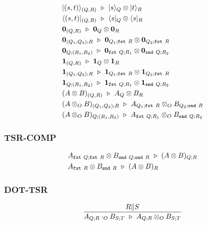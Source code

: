 \begin{align*}
  & |(s, t)\rangle_{(Q, R)} \ \triangleright\  |s\rangle_{Q} \otimes |t\rangle_{R} \\
  & \langle (s, t)|_{(Q, R)} \ \triangleright\  \langle s|_{Q} \otimes \langle s|_{R} \\
  & \mathbf{0}_{(Q, R)} \ \triangleright\  \mathbf{0}_{Q} \otimes \mathbf{0}_{R} \\
  & \mathbf{0}_{(Q_1, Q_2); R} \ \triangleright\  \mathbf{0}_{Q_1; \texttt{fst}\ R} \otimes \mathbf{0}_{Q_2; \texttt{fst}\ R} \\
  & \mathbf{0}_{Q; (R_1, R_2)} \ \triangleright\  \mathbf{0}_{\texttt{fst}\ Q; R_1} \otimes \mathbf{0}_{\texttt{snd}\ Q; R_2} \\
  & \mathbf{1}_{(Q, R)} \ \triangleright\  \mathbf{1}_{Q} \otimes \mathbf{1}_{R} \\
  & \mathbf{1}_{(Q_1, Q_2); R} \ \triangleright\  \mathbf{1}_{Q_1; \texttt{fst}\ R} \otimes \mathbf{1}_{Q_2; \texttt{fst}\ R} \\
  & \mathbf{1}_{Q; (R_1, R_2)} \ \triangleright\  \mathbf{1}_{\texttt{fst}\ Q; R_1} \otimes \mathbf{1}_{\texttt{snd}\ Q; R_2} \\
  & (A \otimes B)_{(Q, R)} \ \triangleright\  A_{Q} \otimes B_{R} \\
  & (A \otimes_O B)_{(Q_1, Q_2); R} \ \triangleright\  A_{Q_1; \texttt{fst}\ R} \otimes_O B_{Q_2; \texttt{snd}\ R} \\
  & (A \otimes_O B)_{Q; (R_1, R_2)} \ \triangleright\  A_{\texttt{fst}\ Q; R_1} \otimes_O B_{\texttt{snd}\ Q; R_2}
\end{align*}


\subsubsection*{\textsf{TSR-COMP}}
\begin{align*}
  & A_{\texttt{fst}\ Q; \texttt{fst}\ R} \otimes B_{\texttt{snd}\ Q; \texttt{snd}\ R} \ \triangleright\  (A \otimes B)_{Q; R} \\
  & A_{\texttt{fst}\ R} \otimes B_{\texttt{snd}\ R} \ \triangleright\  (A \otimes B)_{R}
\end{align*}

\subsubsection*{\textsf{DOT-TSR}}
\begin{align*}
  \frac{R \| S}{A_{Q; R} \cdot_O B_{S; T} \ \triangleright\  A_{Q; R} \otimes_O B_{S; T}}
\end{align*}

